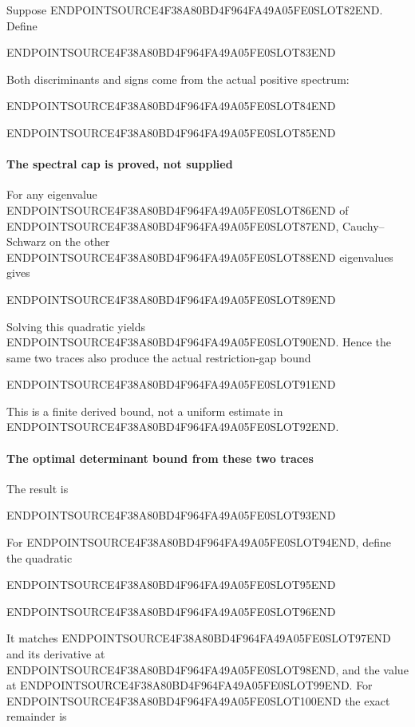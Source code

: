 Suppose ENDPOINTSOURCE4F38A80BD4F964FA49A05FE0SLOT82END. Define

ENDPOINTSOURCE4F38A80BD4F964FA49A05FE0SLOT83END

Both discriminants and signs come from the actual positive spectrum:

ENDPOINTSOURCE4F38A80BD4F964FA49A05FE0SLOT84END

ENDPOINTSOURCE4F38A80BD4F964FA49A05FE0SLOT85END

\paragraph{The spectral cap is proved, not supplied}\label{endpoint-relation_moment_original--the-spectral-cap-is-proved-not-supplied}

For any eigenvalue ENDPOINTSOURCE4F38A80BD4F964FA49A05FE0SLOT86END of ENDPOINTSOURCE4F38A80BD4F964FA49A05FE0SLOT87END, Cauchy--Schwarz on the other ENDPOINTSOURCE4F38A80BD4F964FA49A05FE0SLOT88END eigenvalues gives

ENDPOINTSOURCE4F38A80BD4F964FA49A05FE0SLOT89END

Solving this quadratic yields ENDPOINTSOURCE4F38A80BD4F964FA49A05FE0SLOT90END. Hence the same two traces also produce the actual restriction-gap bound

ENDPOINTSOURCE4F38A80BD4F964FA49A05FE0SLOT91END

This is a finite derived bound, not a uniform estimate in ENDPOINTSOURCE4F38A80BD4F964FA49A05FE0SLOT92END.

\paragraph{The optimal determinant bound from these two traces}\label{endpoint-relation_moment_original--the-optimal-determinant-bound-from-these-two-traces}

The result is

ENDPOINTSOURCE4F38A80BD4F964FA49A05FE0SLOT93END

For ENDPOINTSOURCE4F38A80BD4F964FA49A05FE0SLOT94END, define the quadratic

ENDPOINTSOURCE4F38A80BD4F964FA49A05FE0SLOT95END

ENDPOINTSOURCE4F38A80BD4F964FA49A05FE0SLOT96END

It matches ENDPOINTSOURCE4F38A80BD4F964FA49A05FE0SLOT97END and its derivative at ENDPOINTSOURCE4F38A80BD4F964FA49A05FE0SLOT98END, and the value at ENDPOINTSOURCE4F38A80BD4F964FA49A05FE0SLOT99END. For ENDPOINTSOURCE4F38A80BD4F964FA49A05FE0SLOT100END the exact remainder is

